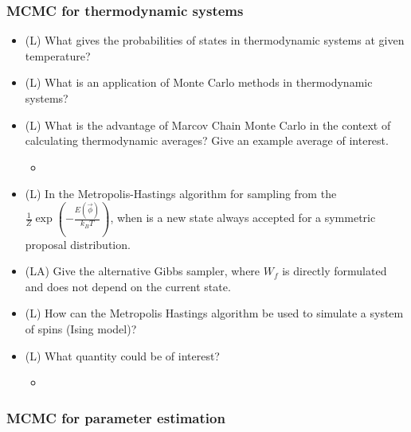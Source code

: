 \subsubsection*{MCMC for thermodynamic systems}

\begin{itemize}
    \item (L) What gives the probabilities of states in thermodynamic systems at given temperature?
    \answerboxM
    \item (L) What is an application of Monte Carlo methods in thermodynamic systems?
    \answerboxM
    \item (L) What is the advantage of Marcov Chain Monte Carlo in the context of calculating thermodynamic averages? Give an example average of interest.
    \begin{itemize}
        \item {}
    \end{itemize}
    \answerboxS
    \item (L) In the Metropolis-Hastings algorithm for sampling from the $\frac{1}{Z} \exp \left( - \frac{E(\vec{\phi})}{k_B T} \right)$, when
    is a new state always accepted for a symmetric proposal distribution.
    \answerboxM
    \item (LA) Give the alternative Gibbs sampler, where $W_f$ is directly formulated and does not depend on the current state.
    \answerboxM
    \item (L) How can the Metropolis Hastings algorithm be used to simulate a system of spins (Ising model)?
    \answerboxL
    \item (L) What quantity could be of interest?
    \begin{itemize}
        \item {}
    \end{itemize}
    \answerboxM
\end{itemize}

\subsubsection*{MCMC for parameter estimation}

